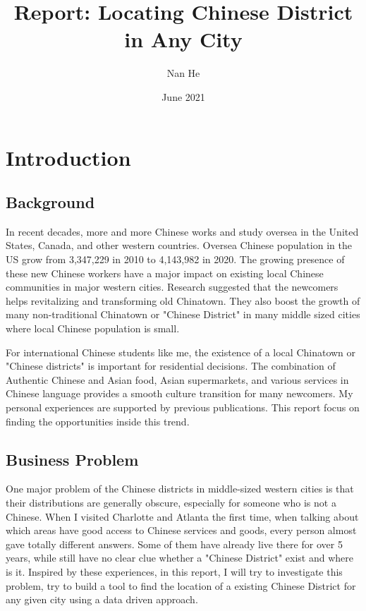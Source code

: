 \documentclass{article}
\title{Report: Locating Chinese District in Any City}
\author{Nan He}
\date{June 2021}
\begin{document}
\maketitle

\section{Introduction}
\subsection{Background}
In recent decades, more and more Chinese works and study oversea in the United States, Canada, and other western countries.
Oversea Chinese population in the US grow from 3,347,229 in 2010 to 4,143,982 in 2020.\cite{census2010chi, census2020chi}
The growing presence of these new Chinese workers have a major impact on existing local Chinese communities in major western cities.
Research suggested that the newcomers helps revitalizing and transforming old Chinatown. \cite{jia2010chinatown}
They also boost the growth of many non-traditional Chinatown or "Chinese District" in many middle sized cities where local Chinese population is small.

For international Chinese students like me, the existence of a local Chinatown or "Chinese districts" is important for residential decisions.
The combination of Authentic Chinese and Asian food, Asian supermarkets, and various services in Chinese language provides a smooth culture transition for many newcomers. My personal experiences are supported by previous publications.\cite{zhou2010chinatown} This report focus on finding the opportunities inside this trend.

\subsection{Business Problem}
One major problem of the Chinese districts in middle-sized western cities is that their distributions are generally obscure, especially for someone who is not a Chinese.
When I visited Charlotte and Atlanta the first time, when talking about which areas have good access to Chinese services and goods, every person almost gave totally different answers.
Some of them have already live there for over 5 years, while still have no clear clue whether a "Chinese District" exist and where is it.
Inspired by these experiences, in this report, I will try to investigate this problem, try to build a tool to find the location of a existing Chinese District for any given city using a data driven approach.
\end{document}
